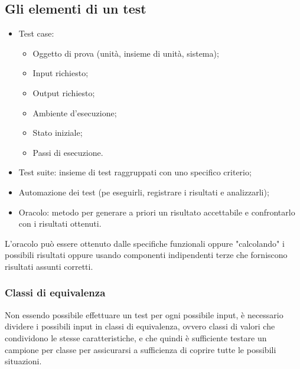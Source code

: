 \documentclass[../main]{subfiles}
\begin{document}
\subsection{Gli elementi di un test}
\begin{itemize}
    \item Test case:
    \begin{itemize}
        \item Oggetto di prova (unità, insieme di unità, sistema);
        \item Input richiesto;
        \item Output richiesto;
        \item Ambiente d'esecuzione;
        \item Stato iniziale;
        \item Passi di esecuzione.
    \end{itemize}
    \item Test suite: insieme di test raggruppati con uno specifico criterio;
    \item Automazione dei test (pe eseguirli, registrare i risultati e analizzarli);
    \item Oracolo: metodo per generare a priori un risultato accettabile e confrontarlo con i risultati ottenuti.
\end{itemize}
L'oracolo può essere ottenuto dalle specifiche funzionali oppure "calcolando" i possibili risultati oppure usando componenti indipendenti terze che forniscono risultati assunti corretti.
\subsubsection{Classi di equivalenza}
Non essendo possibile effettuare un test per ogni possibile input, è necessario dividere i possibili input in classi di equivalenza, ovvero classi di valori che condividono le stesse caratteristiche, e che quindi è sufficiente testare un campione per classe per assicurarsi a sufficienza di coprire tutte le possibili situazioni.
\end{document}
